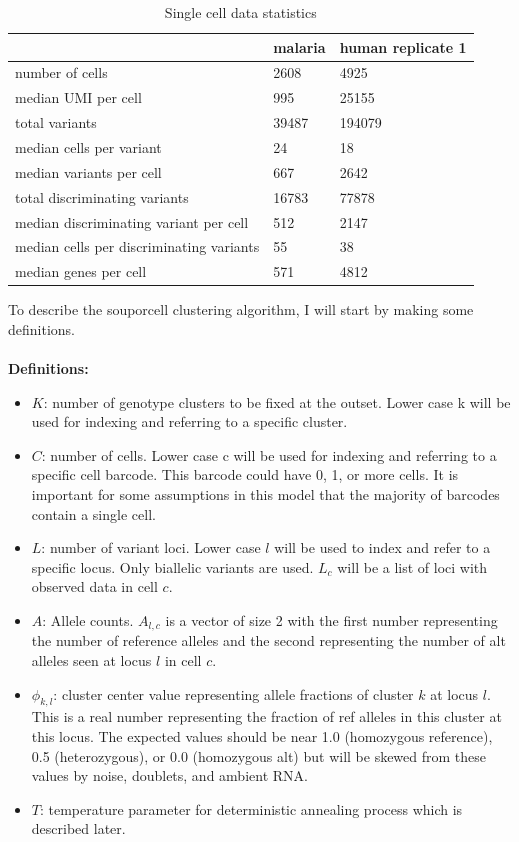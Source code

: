 \begin{table}[h!]
\caption{Single cell data statistics}
\label{table:scdatatable}
\begin{center}
\begin{tabular}{ | l | l | l | } 
 \hline
  & malaria & human replicate 1 \\ 
  \hline
  number of cells & 2608 & 4925  \\
 \hline
  median UMI per cell & 995 & 25155  \\ 
 \hline
 total variants & 39487 & 194079 \\
 \hline
 median cells per variant & 24 & 18 \\
 \hline
 median variants per cell & 667 & 2642  \\ 
 \hline
 total discriminating variants & 16783 & 77878 \\
  \hline
 median discriminating variant per cell & 512 & 2147 \\
 \hline
 median cells per discriminating variants & 55 & 38 \\
 \hline
 median genes per cell & 571 & 4812 \\
 \hline
 
\end{tabular}
\end{center}
\end{table}

\par{
To describe the souporcell clustering algorithm, I will start by making some definitions. \\
} \\
\textbf{Definitions:}
\begin{itemize}
\item $K$: number of genotype clusters to be fixed at the outset. Lower case k will be used for indexing and referring to a specific cluster.
\item $C$: number of cells. Lower case c will be used for indexing and referring to a specific cell barcode. This barcode could have 0, 1, or more cells. It is important for some assumptions in this model that the majority of barcodes contain a single cell. 
\item $L$: number of variant loci. Lower case $l$ will be used to index and refer to a specific locus. Only biallelic variants are used. $L_c$ will be a list of loci with observed data in cell $c$.
\item $A$: Allele counts. $A_{l,c}$ is a vector of size 2 with the first number representing the number of reference alleles and the second representing the number of alt alleles seen at locus $l$ in cell $c$.
\item $\phi_{k,l}$: cluster center value representing allele fractions of cluster $k$ at locus $l$. This is a real number representing the fraction of ref alleles in this cluster at this locus. The expected values should be near 1.0 (homozygous reference), 0.5 (heterozygous), or 0.0 (homozygous alt) but will be skewed from these values by noise, doublets, and ambient RNA. 
\item $T$: temperature parameter for deterministic annealing process which is described later.

\end{itemize}

